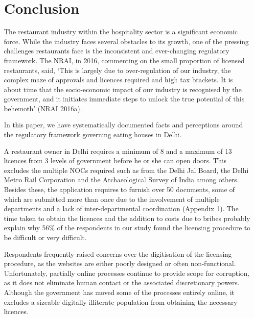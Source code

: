 \documentclass[a4paper, 12pt]{article}
\begin{document}

		\section*{Conclusion}
		\label{end}
		
		The restaurant industry within the hospitality sector is a significant economic force. While the industry faces several obstacles to its growth, one of the pressing challenges restaurants face is the inconsistent and ever-changing regulatory framework. The 
NRAI, in 2016, commenting on the small proportion of licensed restaurants, said, ‘This is largely due to over-regulation of our industry, the complex maze of approvals and licences required and high tax brackets. It is about time that the socio-economic impact of 
our industry is recognised by the government, and it initiates immediate steps to unlock the true potential of this behemoth’ (NRAI 2016a).
		
		In this paper, we have systematically documented facts and perceptions around the regulatory framework governing eating houses in Delhi.
		
		A restaurant owner in Delhi requires a minimum of 8 and a maximum of 13 licences from 3 levels of government before he or she can open doors. This excludes the multiple NOCs required such as from the Delhi Jal Board, the Delhi Metro Rail 
Corporation and the Archaeological Survey of India among others. Besides these, the application requires to furnish over 50 documents, some of which are submitted more than once due to the involvement of multiple departments and a lack of inter-departmental 
coordination (Appendix 1). The time taken to obtain the licences and the addition to costs due to bribes probably explain why 56\% of the respondents in our study found the licensing procedure to be difficult or very difficult.%
		
		Respondents frequently raised concerns over the digitisation of the licensing procedure, as the websites are either poorly designed or often non-functional. Unfortunately, partially online processes continue to provide scope for corruption, as it does not 
eliminate human contact or the associated discretionary powers. Although the government has moved some of the processes entirely online, it excludes a sizeable digitally illiterate population from obtaining the necessary licences.
		
\end{document}
